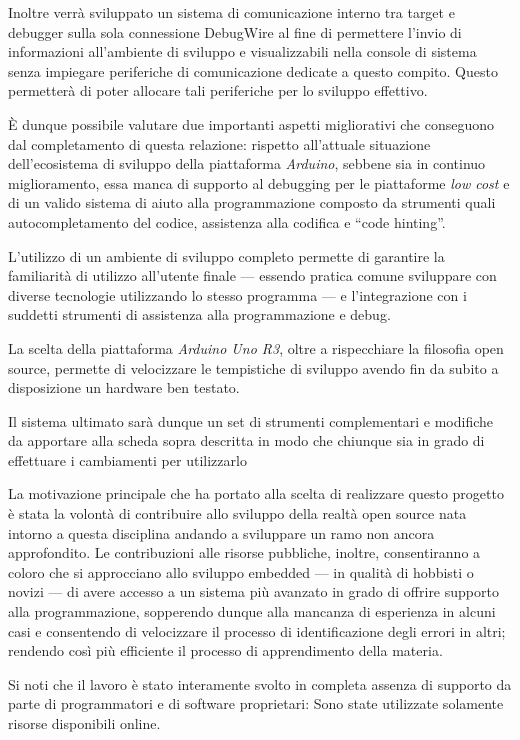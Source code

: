 Inoltre verrà sviluppato un sistema di comunicazione interno tra target e debugger sulla sola connessione DebugWire al fine di permettere l'invio di informazioni all'ambiente di sviluppo e visualizzabili nella console di sistema senza impiegare periferiche di comunicazione dedicate a questo compito. Questo permetterà di poter allocare tali periferiche per lo sviluppo effettivo.

È dunque possibile valutare due importanti aspetti migliorativi che conseguono dal completamento di questa relazione: rispetto all'attuale situazione dell'ecosistema di sviluppo della piattaforma \textit{Arduino}, sebbene sia in continuo miglioramento, essa manca di supporto al debugging per le piattaforme \textit{low cost} e di un valido sistema di aiuto alla programmazione composto da strumenti quali autocompletamento del codice, assistenza alla codifica e ``code hinting''.

L'utilizzo di un ambiente di sviluppo completo permette di garantire la familiarità di utilizzo all'utente finale --- essendo pratica comune sviluppare con diverse tecnologie utilizzando lo stesso programma --- e l'integrazione con i suddetti strumenti di assistenza alla programmazione e debug.

La scelta della piattaforma \textit{Arduino Uno R3}, oltre a rispecchiare la filosofia open source, permette di velocizzare le tempistiche di sviluppo avendo fin da subito a disposizione un hardware ben testato.\cite{site:arduino-mini-le}

Il sistema ultimato sarà dunque un set di strumenti complementari e modifiche da apportare alla scheda sopra descritta in modo che chiunque sia in grado di effettuare i cambiamenti per utilizzarlo

La motivazione principale che ha portato alla scelta di realizzare questo progetto è stata la volontà di contribuire allo sviluppo della realtà open source nata intorno a questa disciplina andando a sviluppare un ramo non ancora approfondito. 
Le contribuzioni alle risorse pubbliche, inoltre, consentiranno a coloro che si approcciano allo sviluppo embedded --- in qualità di hobbisti o novizi --- di avere accesso a un sistema più avanzato in grado di offrire supporto alla programmazione, sopperendo dunque alla mancanza di esperienza in alcuni casi e consentendo di velocizzare il processo di identificazione degli errori in altri; rendendo così più efficiente il processo di apprendimento della materia.

Si noti che il lavoro è stato interamente svolto in completa assenza di supporto da parte di programmatori e di software proprietari: Sono state utilizzate solamente risorse disponibili online. 
